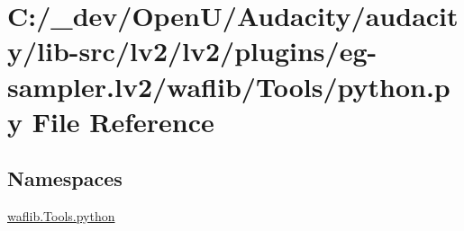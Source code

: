 \hypertarget{lv2_2plugins_2eg-sampler_8lv2_2waflib_2_tools_2python_8py}{}\section{C\+:/\+\_\+dev/\+Open\+U/\+Audacity/audacity/lib-\/src/lv2/lv2/plugins/eg-\/sampler.lv2/waflib/\+Tools/python.py File Reference}
\label{lv2_2plugins_2eg-sampler_8lv2_2waflib_2_tools_2python_8py}
\subsection*{Namespaces}
\begin{DoxyCompactItemize}
\item 
 \hyperlink{namespacewaflib_1_1_tools_1_1python}{waflib.\+Tools.\+python}
\end{DoxyCompactItemize}
